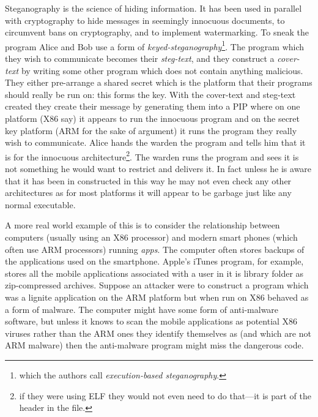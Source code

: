 \documentclass[10pt,]{book}
\begin{document}
Steganography is the science of hiding information\autocite{Gordon:vw}.
It has been used in parallel with cryptography to hide messages in
seemingly innocuous documents\autocite{Saamuson:wt}, to circumvent bans
on cryptography\autocite{Owens:2002uq}, and to implement
watermarking\autocite{Wayner:2009vw}. To sneak the program Alice and Bob
use a form of \emph{keyed-steganography}\footnote{which the
  authors\autocite{Cha:2010uh} call \emph{execution-based
  steganography}.}. The program which they wish to communicate becomes
their \emph{steg-text}, and they construct a \emph{cover-text} by
writing some other program which does not contain anything malicious.
They either pre-arrange a shared secret which is the platform that their
programs should really be run on: this forms the key. With the
cover-text and steg-text created they create their message by generating
them into a PIP where on one platform (X86 say) it appears to run the
innocuous program and on the secret key platform (ARM for the sake of
argument) it runs the program they really wish to communicate. Alice
hands the warden the program and tells him that it is for the innocuous
architecture\footnote{if they were using ELF they would not even need to
  do that---it is part of the header in the file\autocite{mancx:th}.}.
The warden runs the program and sees it is not something he would want
to restrict and delivers it. In fact unless he is aware that it has been
in constructed in this way he may not even check any other architectures
as for most platforms it will appear to be garbage just like any normal
executable.

A more real world example of this is to consider the relationship
between computers (usually using an X86 processor) and modern smart
phones (which often use ARM processors) running \emph{apps}. The
computer often stores backups of the applications used on the
smartphone. Apple's iTunes program, for example, stores all the mobile
applications associated with a user in it is library folder as
zip-compressed archives. Suppose an attacker were to construct a program
which was a lignite application on the ARM platform but when run on X86
behaved as a form of malware. The computer might have some form of
anti-malware software, but unless it knows to scan the mobile
applications as potential X86 viruses rather than the ARM ones they
identify themselves as (and which are not ARM malware) then the
anti-malware program might miss the dangerous code.
\end{document}
